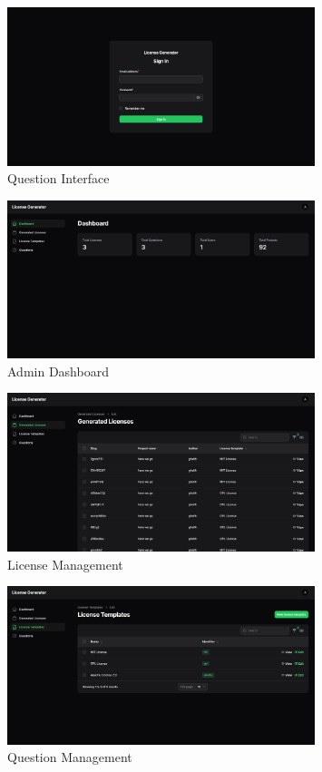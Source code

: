 \documentclass[12pt,a4paper]{report}
\begin{document}
\begin{figure}[H]
    \centering
    \includegraphics[width=0.8\textwidth]{Screenshots/os3.png}
    \caption{Question Interface}
\end{figure}

\begin{figure}[H]
    \centering
    \includegraphics[width=0.8\textwidth]{Screenshots/os4.png}
    \caption{Admin Dashboard}
\end{figure}

\begin{figure}[H]
    \centering
    \includegraphics[width=0.8\textwidth]{Screenshots/os5.png}
    \caption{License Management}
\end{figure}

\begin{figure}[H]
    \centering
    \includegraphics[width=0.8\textwidth]{Screenshots/os6.png}
    \caption{Question Management}
\end{figure}
\end{document}
